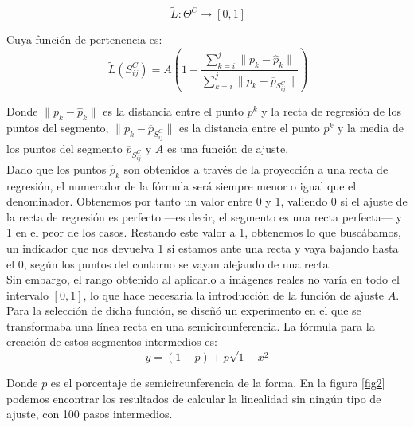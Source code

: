 \[
\ \tilde{L}:\Theta^C \rightarrow \left[ 0,1 \right]
\]

Cuya función de pertenencia es:\\

\[
\ \tilde{L} \left(S^C_{ij}\right) = A \left( 1-\frac{\sum^j_{k=i} \parallel p_k - \widehat{p}_k \parallel}{\sum^j_{k=i} \parallel p_k - \overline{p}_{S^C_{ij}} \parallel} \right)
\]

Donde $\parallel p_k - \widehat{p}_k \parallel$ es la distancia entre el punto $p^k$ y la recta de regresión de los puntos del segmento, $\parallel p_k - \overline{p}_{S^C_{ij}} \parallel$ es la distancia entre el punto $p^k$ y la media de los puntos del segmento $\overline{p}_{S^C_{ij}}$ y $A$ es una función de ajuste.\\

Dado que los puntos $\widehat{p}_k$ son obtenidos a través de la proyección a una recta de regresión, el numerador de la fórmula será siempre menor o igual que el denominador. Obtenemos por tanto un valor entre 0 y 1, valiendo 0 si el ajuste de la recta de regresión es perfecto ---es decir, el segmento es una recta perfecta--- y 1 en el peor de los casos. Restando este valor a 1, obtenemos lo que buscábamos, un indicador que nos devuelva 1 si estamos ante una recta y vaya bajando hasta el 0, según los puntos del contorno se vayan alejando de una recta.\\

Sin embargo, el rango obtenido al aplicarlo a imágenes reales no varía en todo el intervalo $\left[ 0,1 \right]$, lo que hace necesaria la introducción de la función de ajuste $A$. Para la selección de dicha función, se diseñó un experimento en el que se transformaba una línea recta en una semicircunferencia. La fórmula para la creación de estos segmentos intermedios es:\\

\[
\ y = (1-p)+ p \sqrt{1-x^2}
\]

Donde $p$ es el porcentaje de semicircunferencia de la forma. En la figura \ref{fig2} podemos encontrar los resultados de calcular la linealidad sin ningún tipo de ajuste, con 100 pasos intermedios.\\

